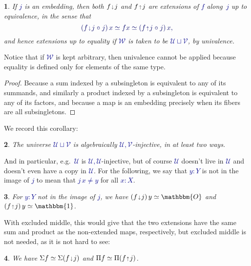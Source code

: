 \documentclass[10pt]{article}
\newcommand{\db}{\textcolor{darkblue}}
\newcommand{\m}[1]{\db{$#1$}}
\newcommand{\M}[1]{\[\db{#1}\]}
\newcommand{\comp}{\mathrel{\circ}}
\newcommand{\U}{\mathcal{U}}
\newcommand{\V}{\mathcal{V}}
\newcommand{\W}{\mathcal{W}}
\newcommand{\Zero}{\mathbbm{O}}
\newcommand{\One}{\mathbbm{1}}
\newcommand{\edown}{\scaleobj{0.7}{\,\downarrow\,}}
\newcommand{\eup}{\scaleobj{0.7}{\,\uparrow\,}}
\newtheorem{numbered}{}
\theoremstyle{definition}
\begin{document}
\begin{numbered}
    If \m{j} is an embedding, then both \m{f \edown j} and \m{f \eup j} are extensions of \m{f} along~\m{j} up to equivalence, in the sense that \M{(f \edown j \comp j) \, x \simeq f x \simeq (f \eup j \comp j) \, x,}
and hence extensions up to equality if \m{\W} is taken to be \m{\U \sqcup \V}, by univalence.
\end{numbered}
\noindent Notice that if \m{\W} is kept arbitrary, then univalence cannot be applied because equality is defined only for elements of the same type.
\begin{proof}
Because a sum indexed by a subsingleton is equivalent to any of its
summands, and similarly a product indexed by a subsingleton is equivalent to
any of its factors, and because a map is an embedding precisely when
its fibers are all subsingletons.
\end{proof}
\noindent We record this corollary:
\begin{numbered}
  The universe \m{\U \sqcup \V} is algebraically \m{\U,\V}-injective, in at least two ways.
\end{numbered}
\noindent And in particular, e.g.\ \m{\U} is \m{\U,\U}-injective, but of course
\m{\U} doesn't live in \m{\U} and doesn't even have a copy in
\m{\U}. For the following, we say that \m{y : Y} is not in the image
of \m{j} to mean that \m{j \, x \ne y} for all \m{x:X}.
\begin{numbered}
        For \m{y:Y} not in the image of \m{j}, we have
        \m{(f \edown j) \, y \simeq \Zero} and
        \m{(f \eup j) \, y \simeq \One}.
  \end{numbered}
\noindent With excluded middle, this would give that the two extensions have
the same sum and product as the non-extended maps, respectively, but
excluded middle is not needed, as it is not hard to see:
\begin{numbered} We have
\m{\Sigma f \simeq \Sigma (f \edown j)} and
\m{\Pi f \simeq \Pi (f \eup j)}.
\end{numbered}
\end{document}

